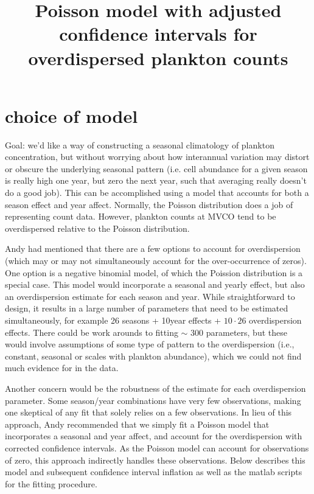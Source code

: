 \documentclass[11pt]{article}
\title{Poisson model with adjusted confidence intervals for overdispersed plankton counts}
\begin{document}
\maketitle
\section{choice of model}

Goal: we'd like a way of constructing a seasonal climatology of plankton concentration, but without worrying about how interannual variation may distort or obscure the underlying seasonal pattern (i.e. cell abundance for a given season is really high one year, but zero the next year, such that averaging really doesn't do a good job). This can be accomplished using a model that accounts for both a season effect and year affect. Normally, the Poisson distribution does a job of representing count data. However, plankton counts at MVCO tend to be overdispersed relative to the Poisson distribution. 

Andy had mentioned that there are a few options to account for overdispersion (which may or may not simultaneously account for the over-occurrence of zeros). One option is a negative binomial model, of which the Poission distribution is a special case. This model would incorporate a seasonal and yearly effect, but also an overdispersion estimate for each season and year. While straightforward to design, it results in a large number of parameters that need to be estimated simultaneously, for example 26 seasons + 10year effects + $10 \cdot 26$ overdispersion effects. There could be work arounds to fitting $\sim$ 300 parameters, but these would involve assumptions of some type of pattern to the overdispersion (i.e., constant, seasonal or scales with plankton abundance), which we could not find much evidence for in the data. 

Another concern would be the robustness of the estimate for each overdispersion parameter. Some season/year combinations have very few observations, making one skeptical of any fit that solely relies on a few observations. In lieu of this approach, Andy recommended that we simply fit a Poisson model that incorporates a seasonal and year affect, and account for the overdispersion with corrected confidence intervals. As the Poisson model can account for observations of zero, this approach indirectly handles these observations. Below describes this model and subsequent confidence interval inflation as well as the matlab scripts for the fitting procedure.
\end{document}
